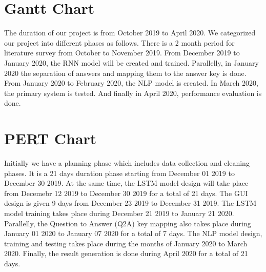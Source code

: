 \section{Gantt Chart}

\noindent The duration of our project is from October 2019 to April 2020.
We categorized our project into different phases as follows. There
is a 2 month period for literature survey from October to November 2019.
From December 2019 to January 2020, the RNN model will be created and trained.
Parallelly, in January 2020 the separation of answers and mapping them
to the answer key is done. From January 2020 to February 2020,
the NLP model is created. In March 2020, the primary system is tested.
And finally in April 2020, performance evaluation is done. 
\newpage
\section{PERT Chart}

\noindent Initially we have a planning phase which includes data collection and
cleaning phases. It is a 21 days duration phase starting from December 01 2019 to
December 30 2019. At the same time, the LSTM model design will take place from
Decemebr 12 2019 to December 30 2019 for a total of 21 days. The GUI design
is given 9 days from December 23 2019 to December 31 2019. The LSTM model training
takes place during December 21 2019 to January 21 2020. Parallelly, the
Question to Answer (Q2A) key mapping also takes place during January 01 2020
to January 07 2020 for a total of 7 days. The NLP model design, training and testing
takes place during the months of January 2020 to March 2020. Finally, the result generation
is done during April 2020 for a total of 21 days. 
